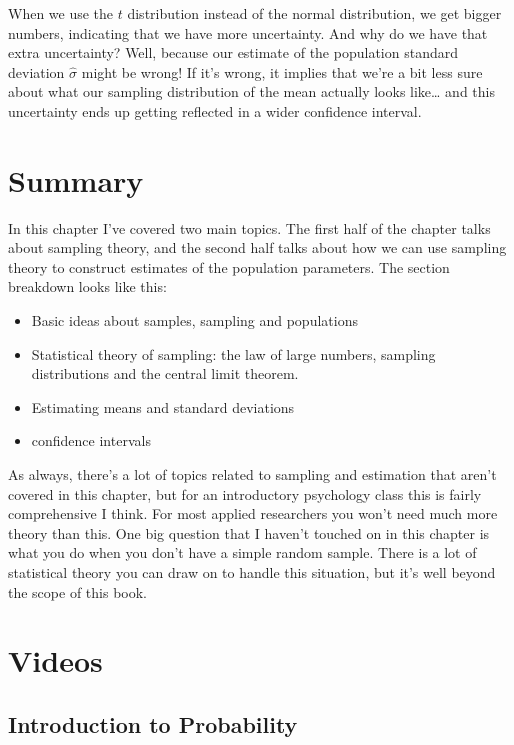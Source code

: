 \documentclass[
]{book}
\begin{document}
When we use the \(t\) distribution instead of the normal distribution, we get bigger numbers, indicating that we have more uncertainty. And why do we have that extra uncertainty? Well, because our estimate of the population standard deviation \(\hat\sigma\) might be wrong! If it's wrong, it implies that we're a bit less sure about what our sampling distribution of the mean actually looks like\ldots{} and this uncertainty ends up getting reflected in a wider confidence interval.

\section{Summary}\label{summary-1}

In this chapter I've covered two main topics. The first half of the chapter talks about sampling theory, and the second half talks about how we can use sampling theory to construct estimates of the population parameters. The section breakdown looks like this:

\begin{itemize}
\item
  Basic ideas about samples, sampling and populations
\item
  Statistical theory of sampling: the law of large numbers, sampling distributions and the central limit theorem.
\item
  Estimating means and standard deviations
\item
  confidence intervals
\end{itemize}

As always, there's a lot of topics related to sampling and estimation that aren't covered in this chapter, but for an introductory psychology class this is fairly comprehensive I think. For most applied researchers you won't need much more theory than this. One big question that I haven't touched on in this chapter is what you do when you don't have a simple random sample. There is a lot of statistical theory you can draw on to handle this situation, but it's well beyond the scope of this book.

\section{Videos}\label{videos-2}

\subsection{Introduction to Probability}\label{introduction-to-probability}
\end{document}
